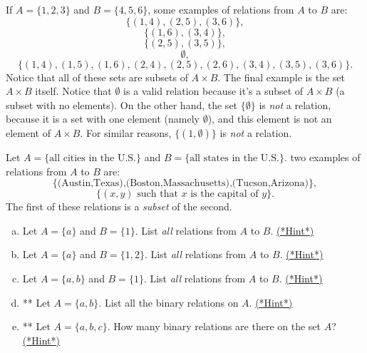\begin{eg}\label{ex_rel}
If $A = \{1,2,3\}$ and $B = \{4,5,6\}$, some examples of relations from $A$ to $B$ are:
\[ \{ (1,4), (2,5), (3,6)\}, \]
\[ \{ (1,6), (3,4)\}, \]
\[ \{ (2,5), (3,5) \}, \]
\[ \emptyset, \]
\[ \{ (1,4), (1,5), (1,6), (2,4), (2,5), (2,6), (3,4), (3,5), (3,6) \}.\] 
Notice that all of these sets are subsets of $A \times B$. The final example is the set $A \times B$ itself. Notice that $\emptyset$ is a valid relation because it's a subset of $A \times B$ (a subset with no elements).  On the other hand, the set $\{ \emptyset \}$ is \emph{not} a relation, because it is  a set with one element (namely $\emptyset$), and this element is not an element of $A \times B$. For similar reasons, $\{(1, \emptyset) \}$ is \emph{not} a relation.
\end{eg}

\begin{eg}
Let $A = \{\text{all cities in the U.S.}\}$ and $B = \{\text{all states in the U.S.}\}$. two examples of relations from $A$ to $B$ are:
\[ \{ \text{(Austin,Texas),(Boston,Massachusetts),(Tucson,Arizona)}\}, \]
\[ \{ (x,y) \text{ such that } x \text{ is the capital of } y \}. \]
The first of these relations  is a \emph{subset} of the second.
\end{eg}


\begin{exercise}\label{exercise:EquivalenceRelationsChap:7}
\begin{enumerate}[(a)]
\item
Let $A = \{a\}$ and $B = \{1\}$. List \emph{all} relations from $A$ to $B$.
\hyperref[sec:EquivalenceRelationsChap:hints]{(*Hint*)}
\item
Let $A = \{a\}$ and $B = \{1,2\}$. List \emph{all} relations from $A$ to $B$.
\hyperref[sec:EquivalenceRelationsChap:hints]{(*Hint*)}
\item
Let $A = \{a,b\}$ and $B = \{1\}$. List \emph{all} relations from $A$ to $B$.
\hyperref[sec:EquivalenceRelationsChap:hints]{(*Hint*)}
\item
** Let $A = \{a,b\}$. List all the binary relations on $A$.
\hyperref[sec:EquivalenceRelationsChap:hints]{(*Hint*)}
\item
** Let $A = \{a,b,c\}$. How many binary relations are there on the set $A$?
\hyperref[sec:EquivalenceRelationsChap:hints]{(*Hint*)}
\end{enumerate}
\end{exercise}



